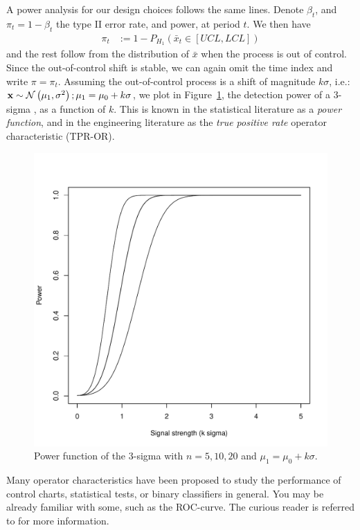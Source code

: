 A power analysis for our design choices follows the same lines.
Denote $\beta_t$, and $\pi_t=1-\beta_t$ the type II error rate, and power, at period $t$.
We then have
\begin{align}
	\pi_t &:= 1-P_{H_1}(\bar{x}_t \in [UCL,LCL])
\end{align}
and the rest follow from the distribution of $\bar{x}$ when the process is out of control.
Since the out-of-control shift is stable, we can again omit the time index and write $\pi=\pi_t$.
Assuming the out-of-control process is a shift of magnitude $k \sigma$, i.e.: $\mathbf{x} \sim \mathcal{N}\left(\mu_1,\sigma^2\right); \mu_1=\mu_0+ k \sigma$, we plot in Figure~\ref{fig:power_function}, the detection power of a 3-sigma \barxChart, as a function of $k$. 
This is known in the statistical literature as a \emph{power function}, and in the engineering literature as the \emph{true positive rate} operator characteristic (TPR-OR).


\begin{figure}[h]
\centering
\includegraphics[height=0.3\textheight]{art/power_function.pdf}
\caption[Power Function]{Power function of the 3-sigma \barxChart with $n=5,10,20$ and $\mu_1=\mu_0 + k \sigma$.}
\label{fig:power_function}
\end{figure}

\begin{extra}
Many operator characteristics have been proposed to study the performance of control charts, statistical tests, or binary classifiers in general.
You may be already familiar with some, such as the ROC-curve. 
The curious reader is referred to \cite{wikipedia_receiver_2015} for more information.
\end{extra}


